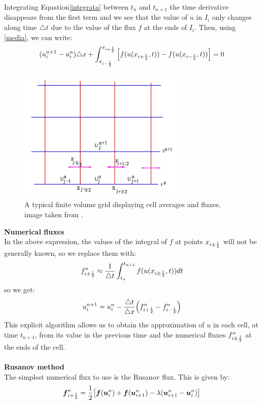 \documentclass[12pt,a4paper]{article}
\numberwithin{equation}{section}
\begin{document}
Integrating Equation\ref{integrata} between $t_n$ and $t_{n+1}$ the time derivative disappears from the first term and we see that the value of $u$ in $I_i$ only changes along time $\triangle t$ due to the value of the flux $f$ at the ends of $I_i$. Then, using \ref{media}, we can write:
\begin{equation}
(u_i^{n+1} - u_i^n)\triangle x + \int_{x_{i-{1\over 2}}}^{x_{i+{1\over 2}}} \Big[f(u(x_{i+{1\over 2}}, t)) - f(u(x_{i-{1\over 2}}, t))\Big] =0
\end{equation}
\begin{figure}[H]
  \centering
    \includegraphics[width=8cm]{grid.jpg}
    \caption{ A typical finite volume grid displaying cell averages and fluxes, image taken from \cite{num_met}.}
    \label{fig:grid}
\end{figure}
\noindent
{\bf Numerical fluxes}\\
In the above expression, the values of the integral of $f$ at points $x_{i\pm {1\over 2}}$ will not be generally known, so we replace them with:
\begin{equation}
f_{i\pm {1\over 2}}^n \approx \frac{1}{\triangle t} \int^{t_{n+1}}_{t_n} f(u(x_{i\pm {1\over 2}},t))dt
\end{equation}
so we get:
\begin{equation} \label{eq:numerical scheme}
u_i^{n+1} = u_i^n -\frac{\triangle t}{\triangle x} \Big(f_{i+ {1\over 2}}^n-f_{i- {1\over 2}}^n\Big) 
\end{equation}
This explicit algorithm allows us to obtain the approximation of $u$ in each cell, at time $t_{n+1}$, from its value in the previous time and the numerical fluxes $f_{i\pm {1\over 2}}^n$ at the ends of the cell.\\
\\
{\bf Rusanov method}\\
The simplest numerical flux to use is the Rusanov flux. This is given by: 
\begin{equation} \label{eq:rusanov}
\boldsymbol{f}_{i+{1\over 2}}^n = {1 \over 2}\big[\boldsymbol{f}(\boldsymbol{u}_i^n) + \boldsymbol{f}(\boldsymbol{u}_{i+1}^n)- \lambda(\boldsymbol{u}_{i+1}^n - \boldsymbol{u}_i^n)\big] 
\end{equation}
\end{document}

